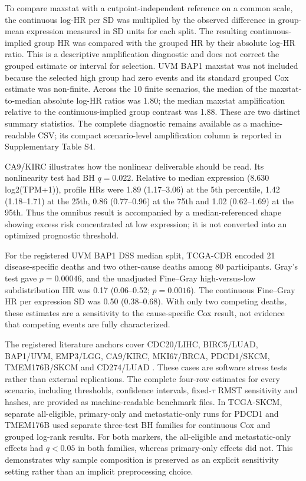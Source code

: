 \documentclass[12pt]{article}
\begin{document}


To compare maxstat with a cutpoint-independent reference on a common scale,
the continuous log-HR per SD was multiplied by the observed difference in
group-mean expression measured in SD units for each split. The resulting
continuous-implied group HR was compared with the grouped HR by their absolute
log-HR ratio. This is a descriptive amplification diagnostic and does not
correct the grouped estimate or interval for selection. UVM BAP1 maxstat was
not included because the selected high group had zero events and its standard
grouped Cox estimate was non-finite. Across the 10 finite scenarios, the median
of the maxstat-to-median absolute log-HR ratios was 1.80; the median maxstat
amplification relative to the continuous-implied group contrast was 1.88.
These are two distinct summary statistics. The complete diagnostic remains
available as a machine-readable CSV; its compact scenario-level amplification
column is reported in Supplementary Table S4.

CA9/KIRC illustrates how the nonlinear deliverable should be read. Its
nonlinearity test had BH \(q=0.022\). Relative to median expression
(8.630 log2(TPM+1)), profile HRs were 1.89 (1.17--3.06) at the 5th percentile,
1.42 (1.18--1.71) at the 25th, 0.86 (0.77--0.96) at the 75th and 1.02
(0.62--1.69) at the 95th. Thus the omnibus result is accompanied by a
median-referenced shape showing excess risk concentrated at low expression;
it is not converted into an optimized prognostic threshold.

For the registered UVM BAP1 DSS median split, TCGA-CDR encoded 21
disease-specific deaths and two other-cause deaths among 80 participants.
Gray's test gave \(p=0.00046\), and the unadjusted Fine--Gray high-versus-low
subdistribution HR was 0.17 (0.06--0.52; \(p=0.0016\)). The continuous
Fine--Gray HR per expression SD was 0.50 (0.38--0.68). With only two competing
deaths, these estimates are a sensitivity to the cause-specific Cox result,
not evidence that competing events are fully characterized.

The registered literature anchors cover CDC20/LIHC, BIRC5/LUAD, BAP1/UVM,
EMP3/LGG, CA9/KIRC, MKI67/BRCA, PDCD1/SKCM, TMEM176B/SKCM and CD274/LUAD
\citep{lai2022cdc20,cao2019birc5,vanEssen2014bap1,wang2020emp3,
tostain2010ca9,petrelli2015ki67,miao2020pdcd1,tmem176bSkcm2022,
chen2020pdl1luad}. These cases are software stress tests rather than external
replications. The
complete four-row estimates for every scenario, including thresholds,
confidence intervals, fixed-\(\tau\) RMST sensitivity and hashes, are provided
as machine-readable benchmark files. In TCGA-SKCM, separate all-eligible,
primary-only and metastatic-only runs for PDCD1 and TMEM176B used separate
three-test BH families for continuous Cox and grouped log-rank results. For
both markers, the all-eligible and metastatic-only effects had \(q<0.05\) in
both families, whereas primary-only effects did not. This demonstrates why
sample composition is preserved as an explicit sensitivity setting rather than
an implicit preprocessing choice.
\end{document}
